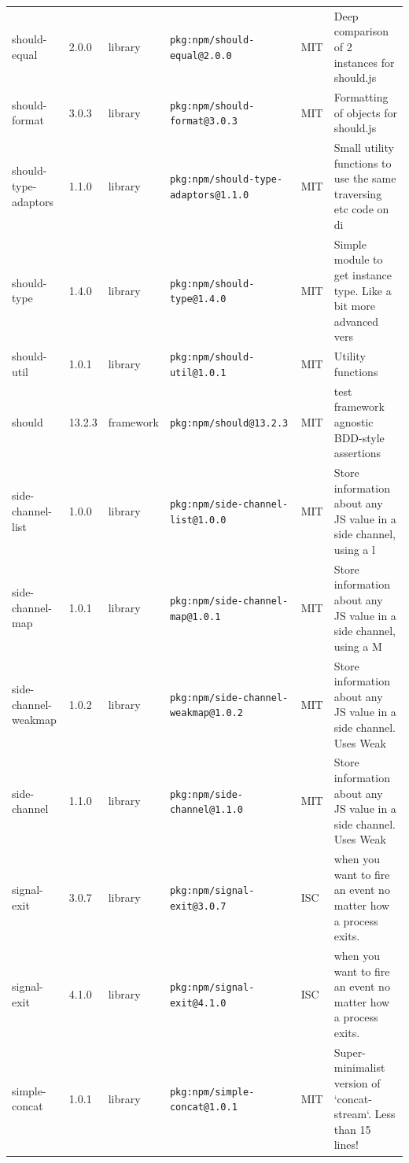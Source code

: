 \documentclass[11pt,a4paper]{article}
\begin{document}
\begin{longtable}{|p{4cm}|p{2cm}|p{1.6cm}|p{5cm}|p{1.5cm}|p{3.5cm}|}
\raggedright should-equal & 2.0.0 & library & \small\texttt{pkg:npm/should-equal@2.0.0} & MIT & \small Deep comparison of 2 instances for should.js \\
\raggedright should-format & 3.0.3 & library & \small\texttt{pkg:npm/should-format@3.0.3} & MIT & \small Formatting of objects for should.js \\
\raggedright should-type-adaptors & 1.1.0 & library & \small\texttt{pkg:npm/should-type-adaptors@1.1.0} & MIT & \small Small utility functions to use the same traversing etc code on di \\
\raggedright should-type & 1.4.0 & library & \small\texttt{pkg:npm/should-type@1.4.0} & MIT & \small Simple module to get instance type. Like a bit more advanced vers \\
\raggedright should-util & 1.0.1 & library & \small\texttt{pkg:npm/should-util@1.0.1} & MIT & \small Utility functions \\
\raggedright should & 13.2.3 & framework & \small\texttt{pkg:npm/should@13.2.3} & MIT & \small test framework agnostic BDD-style assertions \\
\raggedright side-channel-list & 1.0.0 & library & \small\texttt{pkg:npm/side-channel-list@1.0.0} & MIT & \small Store information about any JS value in a side channel, using a l \\
\raggedright side-channel-map & 1.0.1 & library & \small\texttt{pkg:npm/side-channel-map@1.0.1} & MIT & \small Store information about any JS value in a side channel, using a M \\
\raggedright side-channel-weakmap & 1.0.2 & library & \small\texttt{pkg:npm/side-channel-weakmap@1.0.2} & MIT & \small Store information about any JS value in a side channel. Uses Weak \\
\raggedright side-channel & 1.1.0 & library & \small\texttt{pkg:npm/side-channel@1.1.0} & MIT & \small Store information about any JS value in a side channel. Uses Weak \\
\raggedright signal-exit & 3.0.7 & library & \small\texttt{pkg:npm/signal-exit@3.0.7} & ISC & \small when you want to fire an event no matter how a process exits. \\
\raggedright signal-exit & 4.1.0 & library & \small\texttt{pkg:npm/signal-exit@4.1.0} & ISC & \small when you want to fire an event no matter how a process exits. \\
\raggedright simple-concat & 1.0.1 & library & \small\texttt{pkg:npm/simple-concat@1.0.1} & MIT & \small Super-minimalist version of `concat-stream`. Less than 15 lines! \\

\end{longtable}
\end{document}

